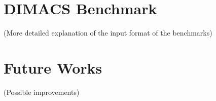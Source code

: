 \documentclass[twocolumn, switch]{article} %
\begin{document}
\section{DIMACS Benchmark}
(More detailed explanation of the input format of the benchmarks)

\section{Future Works}
(Possible improvements)






\normalsize



\end{document}
